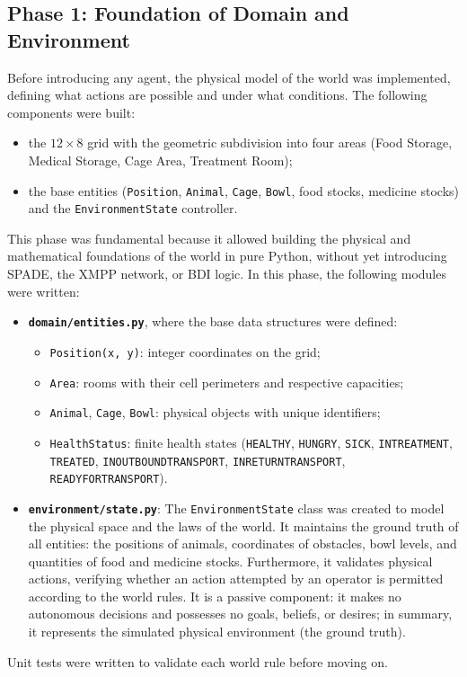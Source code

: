 \documentclass{article}
\renewcommand{\_}{\oldtextunderscore\allowbreak}
\begin{document}
\subsection{Phase 1: Foundation of Domain and Environment}
Before introducing any agent, the physical model of the world was implemented, defining what actions are possible and under what conditions. The following components were built:
\begin{itemize}
    \item the $12 \times 8$ grid with the geometric subdivision into four areas (Food Storage, Medical Storage, Cage Area, Treatment Room);
    \item the base entities (\texttt{Position}, \texttt{Animal}, \texttt{Cage}, \texttt{Bowl}, food stocks, medicine stocks) and the \texttt{EnvironmentState} controller.
\end{itemize}
This phase was fundamental because it allowed building the physical and mathematical foundations of the world in pure Python, without yet introducing SPADE, the XMPP network, or BDI logic.
In this phase, the following modules were written:
\begin{itemize}
    \item \textbf{\texttt{domain/entities.py}}, where the base data structures were defined:
    \begin{itemize}
        \item \texttt{Position(x, y)}: integer coordinates on the grid;
        \item \texttt{Area}: rooms with their cell perimeters and respective capacities;
        \item \texttt{Animal}, \texttt{Cage}, \texttt{Bowl}: physical objects with unique identifiers;
        \item \texttt{HealthStatus}: finite health states (\texttt{HEALTHY}, \texttt{HUNGRY}, \texttt{SICK}, \texttt{IN\_TREATMENT}, \texttt{TREATED}, \texttt{IN\_OUTBOUND\_TRANSPORT}, \texttt{IN\_RETURN\_TRANSPORT}, \texttt{READY\_FOR\_TRANSPORT}).
    \end{itemize}
    \item \textbf{\texttt{environment/state.py}}: The \texttt{EnvironmentState} class was created to model the physical space and the laws of the world. It maintains the ground truth of all entities: the positions of animals, coordinates of obstacles, bowl levels, and quantities of food and medicine stocks. Furthermore, it validates physical actions, verifying whether an action attempted by an operator is permitted according to the world rules. It is a passive component: it makes no autonomous decisions and possesses no goals, beliefs, or desires; in summary, it represents the simulated physical environment (the ground truth).
\end{itemize}
Unit tests were written to validate each world rule before moving on.
\end{document}
